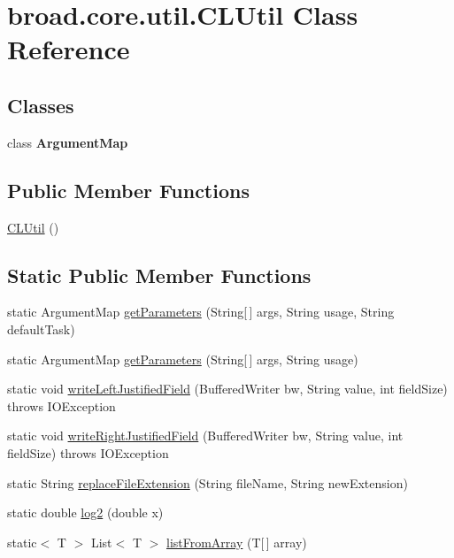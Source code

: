 \hypertarget{classbroad_1_1core_1_1util_1_1_c_l_util}{\section{broad.\+core.\+util.\+C\+L\+Util Class Reference}
\label{classbroad_1_1core_1_1util_1_1_c_l_util}
}
\subsection*{Classes}
\begin{DoxyCompactItemize}
\item 
class {\bfseries Argument\+Map}
\end{DoxyCompactItemize}
\subsection*{Public Member Functions}
\begin{DoxyCompactItemize}
\item 
\hyperlink{classbroad_1_1core_1_1util_1_1_c_l_util_a6c1df173d24e2ada39900c07100ccd96}{C\+L\+Util} ()
\end{DoxyCompactItemize}
\subsection*{Static Public Member Functions}
\begin{DoxyCompactItemize}
\item 
static Argument\+Map \hyperlink{classbroad_1_1core_1_1util_1_1_c_l_util_af748a060e3a4f731198c123625df6b97}{get\+Parameters} (String\mbox{[}$\,$\mbox{]} args, String usage, String default\+Task)
\item 
static Argument\+Map \hyperlink{classbroad_1_1core_1_1util_1_1_c_l_util_a02adb4236d194361a68ee94ad366e14a}{get\+Parameters} (String\mbox{[}$\,$\mbox{]} args, String usage)
\item 
static void \hyperlink{classbroad_1_1core_1_1util_1_1_c_l_util_ae850552dade88bb93208f38e63666e8b}{write\+Left\+Justified\+Field} (Buffered\+Writer bw, String value, int field\+Size)  throws I\+O\+Exception 
\item 
static void \hyperlink{classbroad_1_1core_1_1util_1_1_c_l_util_a49e10768688675c076e643552b63e06e}{write\+Right\+Justified\+Field} (Buffered\+Writer bw, String value, int field\+Size)  throws I\+O\+Exception 
\item 
static String \hyperlink{classbroad_1_1core_1_1util_1_1_c_l_util_a490d543f1adafe5071f456c106ec0db0}{replace\+File\+Extension} (String file\+Name, String new\+Extension)
\item 
static double \hyperlink{classbroad_1_1core_1_1util_1_1_c_l_util_a74f32061be3f8e4ca200005d01d8e14e}{log2} (double x)
\item 
static$<$ T $>$ List$<$ T $>$ \hyperlink{classbroad_1_1core_1_1util_1_1_c_l_util_af391796558bb1817151c04c8a9d8885c}{list\+From\+Array} (T\mbox{[}$\,$\mbox{]} array)
\end{DoxyCompactItemize}


